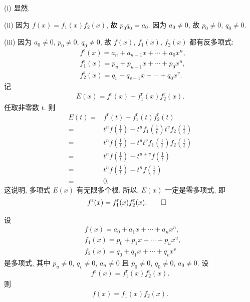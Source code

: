 \begin{pf}
    (i) 显然.

    (ii) 因为 $f(x) = f_1 (x) f_2 (x)$, 故 $p_0 q_0 = a_0$. 因为 $a_0 \neq 0$, 故 $p_0 \neq 0$, $q_0 \neq 0$.

    (iii) 因为 $a_0 \neq 0$, $p_0 \neq 0$, $q_0 \neq 0$, 故 $f(x)$, $f_1 (x)$, $f_2 (x)$ 都有反多项式:
    \begin{align*}
         & f^{\mathrm{r}} (x) = a_n + a_{n-1} x + \cdots + a_0 x^n,   \\
         & f_1^{\mathrm{r}} (x) = p_u + p_{u-1} x + \cdots + p_0 x^u, \\
         & f_2^{\mathrm{r}} (x) = q_v + q_{v-1} x + \cdots + q_0 x^v.
    \end{align*}
    记
    \begin{align*}
        E(x) = f^{\mathrm{r}} (x) - f_1^{\mathrm{r}} (x) f_2^{\mathrm{r}} (x).
    \end{align*}
    任取非零数 $t$. 则
    \begin{align*}
        E(t)
        = {} & f^{\mathrm{r}} (t) - f_1^{\mathrm{r}} (t) f_2^{\mathrm{r}} (t)                                           \\
        = {} & t^n f \left( \frac{1}{t} \right) - t^u f_1 \left( \frac{1}{t} \right) t^v f_2 \left( \frac{1}{t} \right) \\
        = {} & t^n f \left( \frac{1}{t} \right) - t^u t^v f_1 \left( \frac{1}{t} \right) f_2 \left( \frac{1}{t} \right) \\
        = {} & t^n f \left( \frac{1}{t} \right) - t^{u+v} f \left( \frac{1}{t} \right)                                  \\
        = {} & t^n f \left( \frac{1}{t} \right) - t^n f \left( \frac{1}{t} \right)                                      \\
        = {} & 0.
    \end{align*}
    这说明, 多项式 $E(x)$ 有无限多个根. 所以, $E(x)$ 一定是零多项式, 即
    \begin{align*}
         & f^{\mathrm{r}} (x) = f_1^{\mathrm{r}} (x) f_2^{\mathrm{r}} (x). \qedhere
    \end{align*}
\end{pf}

\begin{proposition}
    设
    \begin{align*}
         & f(x) = a_0 + a_1 x + \cdots + a_n x^n,    \\
         & f_1 (x) = p_0 + p_1 x + \cdots + p_u x^u, \\
         & f_2 (x) = q_0 + q_1 x + \cdots + q_v x^v
    \end{align*}
    是多项式, 其中 $p_u \neq 0$, $q_v \neq 0$, $a_n \neq 0$ 且 $p_0 \neq 0$, $q_0 \neq 0$, $a_0 \neq 0$. 设
    \begin{align*}
        f^{\mathrm{r}} (x) = f_1^{\mathrm{r}} (x) f_2^{\mathrm{r}} (x).
    \end{align*}
    则
    \begin{align*}
        f(x) = f_1 (x) f_2 (x).
    \end{align*}
\end{proposition}

